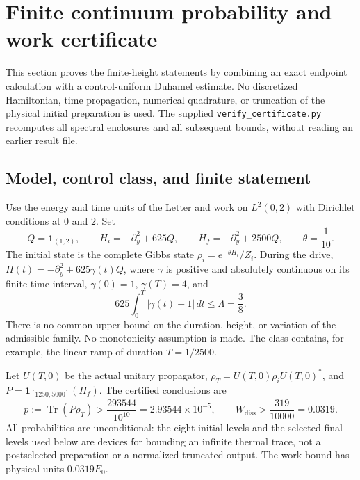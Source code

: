 \documentclass[aps,prl,reprint,superscriptaddress,longbibliography]{revtex4-2}
\begin{document}
\section{Finite continuum probability and work certificate}
\label{ce:section}

This section proves the finite-height statements by combining an exact
endpoint calculation with a control-uniform Duhamel estimate. No discretized
Hamiltonian, time propagation, numerical quadrature, or truncation of the
physical initial preparation is used. The supplied
\texttt{verify\_certificate.py} recomputes all spectral enclosures and all
subsequent bounds, without reading an earlier result file.

\subsection{Model, control class, and finite statement}

Use the energy and time units of the Letter and work on $L^2(0,2)$ with
Dirichlet conditions at $0$ and $2$. Set
\begin{equation}
 Q=\mathbf1_{(1,2)},\qquad
 H_i=-\partial_y^2+625Q,\qquad
 H_f=-\partial_y^2+2500Q,\qquad \theta=\frac1{10}.
 \label{ce:model}
\end{equation}
The initial state is the complete Gibbs state
$\rho_i=e^{-\theta H_i}/Z_i$. During the drive,
$H(t)=-\partial_y^2+625\gamma(t)Q$, where $\gamma$ is positive and absolutely
continuous on its finite time interval, $\gamma(0)=1$, $\gamma(T)=4$, and
\begin{equation}
 625\int_0^T|\gamma(t)-1|\,dt\le\Lambda=\frac38.
 \label{ce:action}
\end{equation}
There is no common upper bound on the duration, height, or variation of the
admissible family. No monotonicity assumption is made. The class contains,
for example, the linear ramp of duration $T=1/2500$.

Let $U(T,0)$ be the actual unitary propagator, $\rho_T=U(T,0)\rho_iU(T,0)^*$,
and $P=\mathbf1_{[1250,5000]}(H_f)$. The certified conclusions are
\begin{equation}
 p:=\operatorname{Tr}(P\rho_T)>
 \frac{293544}{10^{10}}=2.93544\times10^{-5},
 \qquad
 W_{\mathrm{diss}}>\frac{319}{10000}=0.0319.
 \label{ce:conclusion}
\end{equation}
All probabilities are unconditional: the eight initial levels and the
selected final levels used below are devices for bounding an infinite
thermal trace, not a postselected preparation or a normalized truncated
output. The work bound has physical units $0.0319E_0$.
\end{document}
